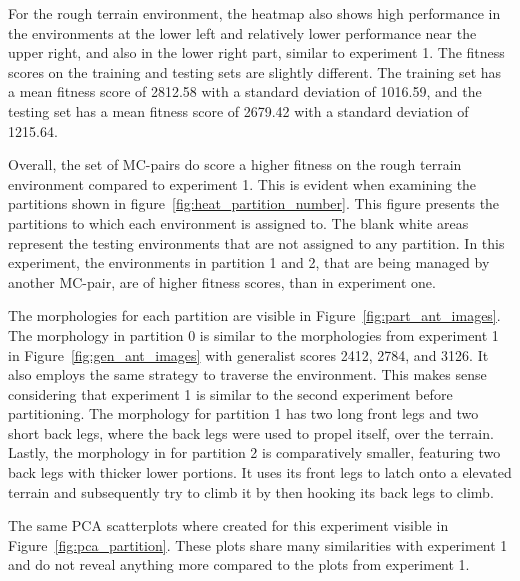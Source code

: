         For the rough terrain environment, the heatmap also shows high performance in the environments at the lower left and relatively lower performance near the upper right, and also in the lower right part, similar to experiment 1. The fitness scores on the training and testing sets are slightly different. The training set has a mean fitness score of 2812.58 with a standard deviation of 1016.59, and the testing set has a mean fitness score of 2679.42 with a standard deviation of 1215.64. 

        Overall, the set of MC-pairs do score a higher fitness on the rough terrain environment compared to experiment 1. This is evident when examining the partitions shown in figure~\ref{fig:heat_partition_number}. This figure presents the partitions to which each environment is assigned to. The blank white areas represent the testing environments that are not assigned to any partition. In this experiment, the environments in partition 1 and 2, that are being managed by another MC-pair, are of higher fitness scores, than in experiment one.

        The morphologies for each partition are visible in Figure~\ref{fig:part_ant_images}. The morphology in partition 0 is similar to the morphologies from experiment 1 in Figure~\ref{fig:gen_ant_images} with generalist scores 2412, 2784, and 3126. It also employs the same strategy to traverse the environment. This makes sense considering that experiment 1 is similar to the second experiment before partitioning. The morphology for partition 1 has two long front legs and two short back legs, where the back legs were used to propel itself, over the terrain. Lastly, the morphology in for partition 2 is comparatively smaller, featuring two back legs with thicker lower portions. It uses its front legs to latch onto a elevated terrain and subsequently try to climb it by then hooking its back legs to climb.

        The same PCA scatterplots where created for this experiment visible in Figure~\ref{fig:pca_partition}. These plots share many similarities with experiment 1 and do not reveal anything more compared to the plots from experiment 1.

